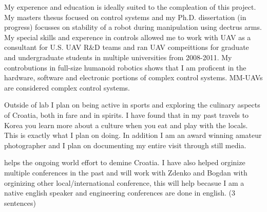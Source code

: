 \documentclass[12pt]{article}
\begin{document}
My experence and education is ideally suited to the compleation of this project.  My masters thesus focused on control systems and my Ph.D. dissertation (in progress) focusses on stability of a robot during manipulation using dectrus arms.  My special skills and experence in controls allowed me to work with UAV as a consultant for U.S. UAV R\&D teams and ran UAV compeittions for graduate and undergraduate students in multiple universities from 2008-2011.  My controbutions in full-size humanoid robotics shows that I am proficent in the hardware, software and electronic portions of complex control systems.  MM-UAVs are considered complex control systems.



Outside of lab I plan on being active in sports and exploring the culinary aspects of Croatia, both in fare and in spirits.  
I have found that in my past travels to Korea you learn more about a culture when you eat and play with the locals.  
This is exactly what I plan on doing.  
In addition I am an award winning amateur photographer and I plan on documenting my entire visit through still media.




helps the ongoing world effort to demine Croatia.  I have also helped orginize multiple conferences in 
the past and will work with Zdenko and Bogdan with orginizing other local/international conference, 
this will help becasue I am a native english speaker and engineering conferences are done in english. 
(3 sentences)
\end{document}
